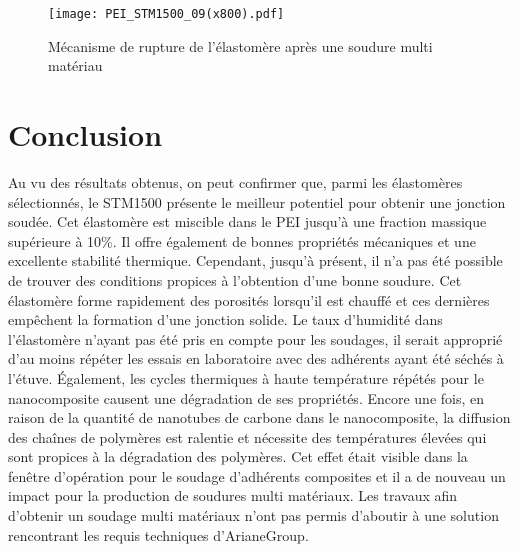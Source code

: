\begin{figure}[h]
	\centering
	\texttt{[image: PEI\_STM1500\_09(x800).pdf]}
	\caption{Mécanisme de rupture de l'élastomère après une soudure multi matériau}
	\label{fig:SEM_mix_STM1500_PEI}
\end{figure}

\FloatBarrier
\section{Conclusion}

Au vu des résultats obtenus, on peut confirmer que, parmi les élastomères sélectionnés, le STM1500 présente le meilleur potentiel pour obtenir une jonction soudée. 
Cet élastomère est miscible dans le PEI jusqu'à une fraction massique supérieure à 10\%. 
Il offre également de bonnes propriétés mécaniques et une excellente stabilité thermique. 
Cependant, jusqu'à présent, il n'a pas été possible de trouver des conditions propices à l'obtention d'une bonne soudure. 
Cet élastomère forme rapidement des porosités lorsqu'il est chauffé et ces dernières empêchent la formation d'une jonction solide. 
Le taux d'humidité dans l'élastomère n'ayant pas été pris en compte pour les soudages, il serait approprié d'au moins répéter les essais en laboratoire avec des adhérents ayant été séchés à l'étuve. 
Également, les cycles thermiques à haute température répétés pour le nanocomposite causent une dégradation de ses propriétés. 
Encore une fois, en raison de la quantité de nanotubes de carbone dans le nanocomposite, la diffusion des chaînes de polymères est ralentie et nécessite des températures élevées qui sont propices à la dégradation des polymères. 
Cet effet était visible dans la fenêtre d'opération pour le soudage d'adhérents composites et il a de nouveau un impact pour la production de soudures multi matériaux. 
Les travaux afin d'obtenir un soudage multi matériaux n'ont pas permis d'aboutir à une solution rencontrant les requis techniques d'ArianeGroup. 